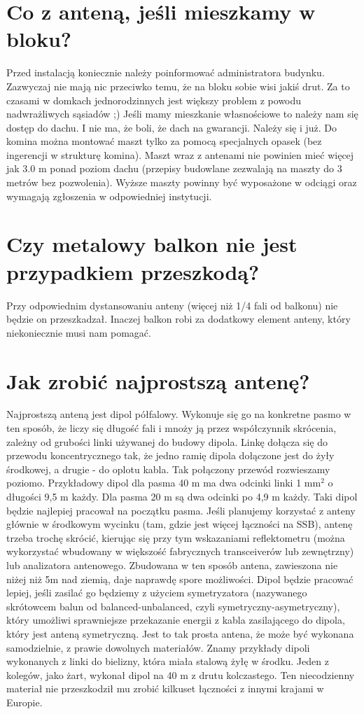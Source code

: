 \documentclass[a4paper,12pt]{article}
\begin{document}
\section{Co z anteną, jeśli mieszkamy w bloku?}
Przed instalacją koniecznie należy poinformować administratora budynku. Zazwyczaj nie mają nic przeciwko temu, że na bloku sobie wisi jakiś drut. Za to czasami w domkach jednorodzinnych jest większy problem z powodu nadwrażliwych sąsiadów ;)
Jeśli mamy mieszkanie własnościowe to należy nam się dostęp do dachu. I nie ma, że boli, że dach na gwarancji. Należy się i już.
Do komina można montować maszt tylko za pomocą specjalnych opasek (bez ingerencji w strukturę komina). Maszt wraz z antenami nie powinien mieć więcej jak 3.0 m ponad poziom dachu (przepisy budowlane zezwalają na maszty do 3 metrów bez pozwolenia). Wyższe maszty powinny być wyposażone w odciągi oraz wymagają zgłoszenia w odpowiedniej instytucji.

\section{Czy metalowy balkon nie jest przypadkiem przeszkodą?}
Przy odpowiednim dystansowaniu anteny (więcej niż 1/4 fali od balkonu) nie będzie on przeszkadzał. Inaczej balkon robi za dodatkowy element anteny, który niekoniecznie musi nam pomagać.

\section{Jak zrobić najprostszą antenę?}
Najprostszą anteną jest dipol półfalowy. Wykonuje się go na konkretne pasmo w ten sposób, że liczy się długość fali i mnoży ją przez współczynnik skrócenia, zależny od grubości linki używanej do budowy dipola. Linkę dołącza się do przewodu koncentrycznego tak, że jedno ramię dipola dołączone jest do żyły środkowej, a drugie - do oplotu kabla. Tak połączony przewód rozwieszamy poziomo. Przykładowy dipol dla pasma 40 m ma dwa odcinki linki 1 mm\(^2\) o długości 9,5 m każdy. Dla pasma 20 m są dwa odcinki po 4,9 m każdy. Taki dipol będzie najlepiej pracował na początku pasma. Jeśli planujemy korzystać z anteny głównie w środkowym wycinku (tam, gdzie jest więcej łączności na SSB), antenę trzeba trochę skrócić, kierując się przy tym wskazaniami reflektometru (można wykorzystać wbudowany w większość fabrycznych transceiverów lub zewnętrzny) lub analizatora antenowego. Zbudowana w ten sposób antena, zawieszona nie niżej niż 5m nad ziemią, daje naprawdę spore możliwości. Dipol będzie pracować lepiej, jeśli zasilać go będziemy z użyciem symetryzatora (nazywanego skrótowcem balun od balanced-unbalanced, czyli symetryczny-asymetryczny), który umożliwi sprawniejsze przekazanie energii z kabla zasilającego do dipola, który jest anteną symetryczną.
Jest to tak prosta antena, że może być wykonana samodzielnie, z prawie dowolnych materiałów. Znamy przykłady dipoli wykonanych z linki do bielizny, która miała stalową żyłę w środku. Jeden z kolegów, jako żart, wykonał dipol na 40 m z drutu kolczastego. Ten niecodzienny materiał nie przeszkodził mu zrobić kilkuset łączności z innymi krajami w Europie.
\end{document}
